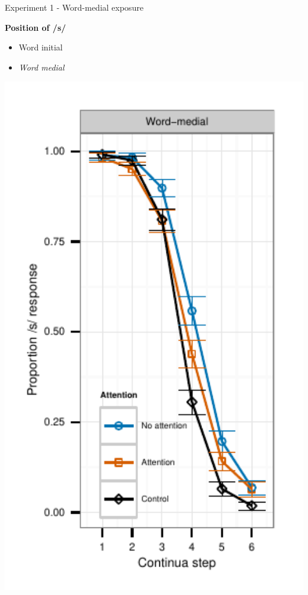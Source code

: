 \documentclass{beamer}
\begin{document}
\begin{frame}{Experiment 1 - Word-medial exposure}
\begin{minipage}{0.45\textwidth}
\textbf{Position of /s/}
\begin{itemize}
\item Word initial
\item \emph{Word medial}
\end{itemize}
\end{minipage}
\hfill
\begin{minipage}{0.4\textwidth}
\includegraphics[width=1.0\textwidth]{graphs/exp1_categresults_present2-final}
\end{minipage}

\end{frame}
\end{document}
